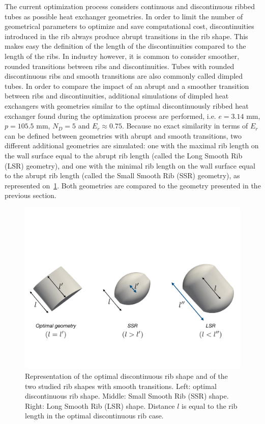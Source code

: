 The current optimization process considers continuous and discontinuous ribbed tubes as possible heat exchanger geometries. In order to limit the number of geometrical parameters to optimize and save computational cost, discontinuities introduced in the rib always produce abrupt transitions in the rib shape. This makes easy the definition of the length of the discontinuities compared to the length of the ribs. In industry however, it is common to consider smoother, rounded transitions between ribs and discontinuities. Tubes with rounded discontinuous ribs and smooth transitions are also commonly called dimpled tubes. In order to compare the impact of an abrupt and a smoother transition between ribs and discontinuities, additional simulations of dimpled heat exchangers with geometries similar to the optimal discontinuously ribbed heat exchanger found during the optimization process are performed, i.e. $e=3.14$ mm, $p=105.5$ mm, $N_D=5$ and $E_r \approx 0.75$. Because no exact similarity in terms of $E_r$ can be defined between geometries with abrupt and smooth transitions, two different additional geometries are simulated: one with the maximal rib length on the wall surface equal to the abrupt rib length (called the Long Smooth Rib (LSR) geometry), and one with the minimal rib length on the wall surface equal to the abrupt rib length (called the Small Smooth Rib (SSR) geometry), as represented on~\cref{rib_shapes}. Both geometries are compared to the geometry presented in the previous section.

\begin{figure}[h]
\centering
\includegraphics[width=14cm]{fig/applications/optim/rib_shapes.pdf}
\caption{Representation of the optimal discontinuous rib shape and of the two studied rib shapes with smooth transitions. Left: optimal discontinuous rib shape. Middle: Small Smooth Rib (SSR) shape. Right: Long Smooth Rib (LSR) shape. Distance $l$ is equal to the rib length in the optimal discontinuous rib case.}
\label{rib_shapes}
\end{figure}

